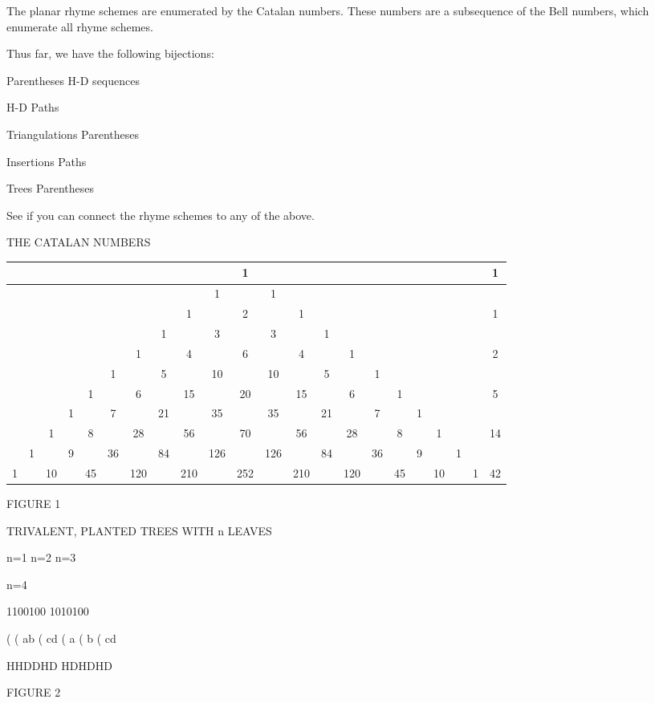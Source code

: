 \documentclass[10pt,letter]{article}
\begin{document}
The planar rhyme schemes are enumerated by the Catalan numbers. These
numbers are a subsequence of the Bell numbers, which enumerate all rhyme
schemes.

Thus far, we have the following bijections:

Parentheses  H-D sequences

H-D  Paths

Triangulations  Parentheses

Insertions  Paths

Trees  Parentheses

See if you can connect the rhyme schemes to any of the above.

THE CATALAN NUMBERS

\begin{longtable}[]{@{}cccccccccccccccccccccc@{}}
\toprule
& & & & & & & & & & 1 & & & & & & & & & & & 1\tabularnewline
\midrule
\endhead
& & & & & & & & & 1 & & 1 & & & & & & & & & &\tabularnewline
& & & & & & & & 1 & & 2 & & 1 & & & & & & & & & 1\tabularnewline
& & & & & & & 1 & & 3 & & 3 & & 1 & & & & & & & &\tabularnewline
& & & & & & 1 & & 4 & & 6 & & 4 & & 1 & & & & & & & 2\tabularnewline
& & & & & 1 & & 5 & & 10 & & 10 & & 5 & & 1 & & & & & &\tabularnewline
& & & & 1 & & 6 & & 15 & & 20 & & 15 & & 6 & & 1 & & & & &
5\tabularnewline
& & & 1 & & 7 & & 21 & & 35 & & 35 & & 21 & & 7 & & 1 & & &
&\tabularnewline
& & 1 & & 8 & & 28 & & 56 & & 70 & & 56 & & 28 & & 8 & & 1 & & &
14\tabularnewline
& 1 & & 9 & & 36 & & 84 & & 126 & & 126 & & 84 & & 36 & & 9 & & 1 &
&\tabularnewline
1 & & 10 & & 45 & & 120 & & 210 & & 252 & & 210 & & 120 & & 45 & & 10 &
& 1 & 42\tabularnewline
\bottomrule

\end{longtable}

FIGURE 1

TRIVALENT, PLANTED TREES WITH n LEAVES

n=1 n=2 n=3

n=4

1100100 1010100

( ( ab ( cd ( a ( b ( cd

HHDDHD HDHDHD

FIGURE 2
\end{document}
